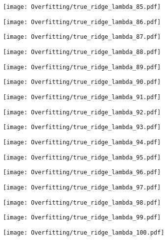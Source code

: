 \documentclass[xcolor=pdftex,dvipsnames,table]{beamer}
\begin{document}
\frame
{
	\begin{center}
		\texttt{[image: Overfitting/true\_ridge\_lambda\_85.pdf]}
	\end{center}
}
\frame
{
	\begin{center}
		\texttt{[image: Overfitting/true\_ridge\_lambda\_86.pdf]}
	\end{center}
}
\frame
{
	\begin{center}
		\texttt{[image: Overfitting/true\_ridge\_lambda\_87.pdf]}
	\end{center}
}
\frame
{
	\begin{center}
		\texttt{[image: Overfitting/true\_ridge\_lambda\_88.pdf]}
	\end{center}
}
\frame
{
	\begin{center}
		\texttt{[image: Overfitting/true\_ridge\_lambda\_89.pdf]}
	\end{center}
}
\frame
{
	\begin{center}
		\texttt{[image: Overfitting/true\_ridge\_lambda\_90.pdf]}
	\end{center}
}
\frame
{
	\begin{center}
		\texttt{[image: Overfitting/true\_ridge\_lambda\_91.pdf]}
	\end{center}
}
\frame
{
	\begin{center}
		\texttt{[image: Overfitting/true\_ridge\_lambda\_92.pdf]}
	\end{center}
}
\frame
{
	\begin{center}
		\texttt{[image: Overfitting/true\_ridge\_lambda\_93.pdf]}
	\end{center}
}
\frame
{
	\begin{center}
		\texttt{[image: Overfitting/true\_ridge\_lambda\_94.pdf]}
	\end{center}
}
\frame
{
	\begin{center}
		\texttt{[image: Overfitting/true\_ridge\_lambda\_95.pdf]}
	\end{center}
}
\frame
{
	\begin{center}
		\texttt{[image: Overfitting/true\_ridge\_lambda\_96.pdf]}
	\end{center}
}
\frame
{
	\begin{center}
		\texttt{[image: Overfitting/true\_ridge\_lambda\_97.pdf]}
	\end{center}
}
\frame
{
	\begin{center}
		\texttt{[image: Overfitting/true\_ridge\_lambda\_98.pdf]}
	\end{center}
}
\frame
{
	\begin{center}
		\texttt{[image: Overfitting/true\_ridge\_lambda\_99.pdf]}
	\end{center}
}
\frame
{
	\begin{center}
		\texttt{[image: Overfitting/true\_ridge\_lambda\_100.pdf]}
	\end{center}
}
\end{document}
